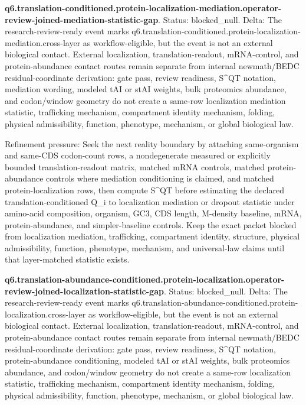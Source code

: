 \textbf{q6.translation-conditioned.protein-localization-mediation.operator-review-joined-mediation-statistic-gap}. Status: blocked\_null. Delta: The research-review-ready event marks q6.translation-conditioned.protein-localization-mediation.cross-layer as workflow-eligible, but the event is not an external biological contact. External localization, translation-readout, mRNA-control, and protein-abundance contact routes remain separate from internal newmath/BEDC residual-coordinate derivation: gate pass, review readiness, S\textasciicircum{}QT notation, mediation wording, modeled tAI or stAI weights, bulk proteomics abundance, and codon/window geometry do not create a same-row localization mediation statistic, trafficking mechanism, compartment identity mechanism, folding, physical admissibility, function, phenotype, mechanism, or global biological law.

Refinement pressure: Seek the next reality boundary by attaching same-organism and same-CDS codon-count rows, a nondegenerate measured or explicitly bounded translation-readout matrix, matched mRNA controls, matched protein-abundance controls where mediation conditioning is claimed, and matched protein-localization rows, then compute S\textasciicircum{}QT before estimating the declared translation-conditioned Q\_i to localization mediation or dropout statistic under amino-acid composition, organism, GC3, CDS length, M-density baseline, mRNA, protein-abundance, and simpler-baseline controls. Keep the exact packet blocked from localization mediation, trafficking, compartment identity, structure, physical admissibility, function, phenotype, mechanism, and universal-law claims until that layer-matched statistic exists.

\textbf{q6.translation-abundance-conditioned.protein-localization.operator-review-joined-localization-statistic-gap}. Status: blocked\_null. Delta: The research-review-ready event marks q6.translation-abundance-conditioned.protein-localization.cross-layer as workflow-eligible, but the event is not an external biological contact. External localization, translation-readout, mRNA-control, and protein-abundance contact routes remain separate from internal newmath/BEDC residual-coordinate derivation: gate pass, review readiness, S\textasciicircum{}QT notation, protein-abundance conditioning, modeled tAI or stAI weights, bulk proteomics abundance, and codon/window geometry do not create a same-row localization statistic, trafficking mechanism, compartment identity mechanism, folding, physical admissibility, function, phenotype, mechanism, or global biological law.

